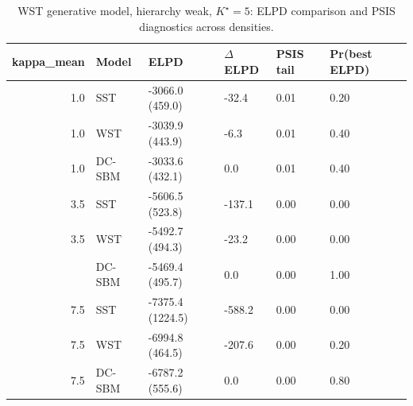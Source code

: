 \begin{table}
\centering
\caption{WST generative model, hierarchy weak, $K^\star=5$: ELPD comparison and PSIS diagnostics across densities.}
\centering
\begin{tabular}[t]{rlllll}
\toprule
kappa_mean & Model & ELPD & $\Delta$ELPD & PSIS tail & Pr(best ELPD)\\
\midrule
1.0 & SST & -3066.0 (459.0) & -32.4 & 0.01 & 0.20\\
1.0 & WST & -3039.9 (443.9) & -6.3 & 0.01 & 0.40\\
1.0 & DC-SBM & -3033.6 (432.1) & 0.0 & 0.01 & 0.40\\
3.5 & SST & -5606.5 (523.8) & -137.1 & 0.00 & 0.00\\
3.5 & WST & -5492.7 (494.3) & -23.2 & 0.00 & 0.00\\
\addlinespace
3.5 & DC-SBM & -5469.4 (495.7) & 0.0 & 0.00 & 1.00\\
7.5 & SST & -7375.4 (1224.5) & -588.2 & 0.00 & 0.00\\
7.5 & WST & -6994.8 (464.5) & -207.6 & 0.00 & 0.20\\
7.5 & DC-SBM & -6787.2 (555.6) & 0.0 & 0.00 & 0.80\\
\bottomrule
\end{tabular}
\end{table}

